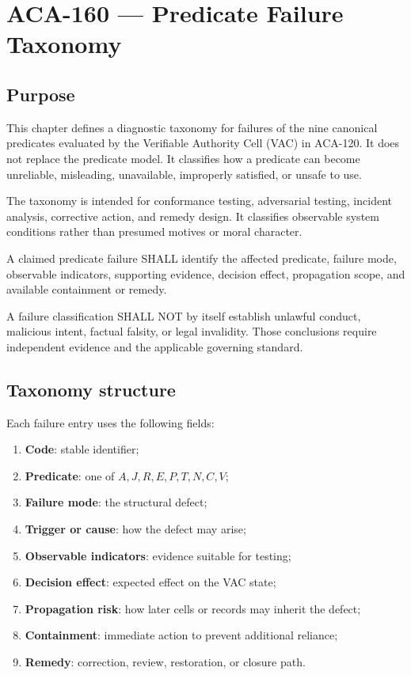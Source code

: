 \chapter{ACA-160 --- Predicate Failure Taxonomy}

\section{Purpose}
This chapter defines a diagnostic taxonomy for failures of the nine canonical predicates evaluated by the Verifiable Authority Cell (VAC) in ACA-120. It does not replace the predicate model. It classifies how a predicate can become unreliable, misleading, unavailable, improperly satisfied, or unsafe to use.

The taxonomy is intended for conformance testing, adversarial testing, incident analysis, corrective action, and remedy design. It classifies observable system conditions rather than presumed motives or moral character.

\begin{requirement}[ACA-160-001]
A claimed predicate failure SHALL identify the affected predicate, failure mode, observable indicators, supporting evidence, decision effect, propagation scope, and available containment or remedy.
\end{requirement}

\begin{requirement}[ACA-160-002]
A failure classification SHALL NOT by itself establish unlawful conduct, malicious intent, factual falsity, or legal invalidity. Those conclusions require independent evidence and the applicable governing standard.
\end{requirement}

\section{Taxonomy structure}
Each failure entry uses the following fields:
\begin{enumerate}
\item \textbf{Code}: stable identifier;
\item \textbf{Predicate}: one of $A,J,R,E,P,T,N,C,V$;
\item \textbf{Failure mode}: the structural defect;
\item \textbf{Trigger or cause}: how the defect may arise;
\item \textbf{Observable indicators}: evidence suitable for testing;
\item \textbf{Decision effect}: expected effect on the VAC state;
\item \textbf{Propagation risk}: how later cells or records may inherit the defect;
\item \textbf{Containment}: immediate action to prevent additional reliance;
\item \textbf{Remedy}: correction, review, restoration, or closure path.
\end{enumerate}

